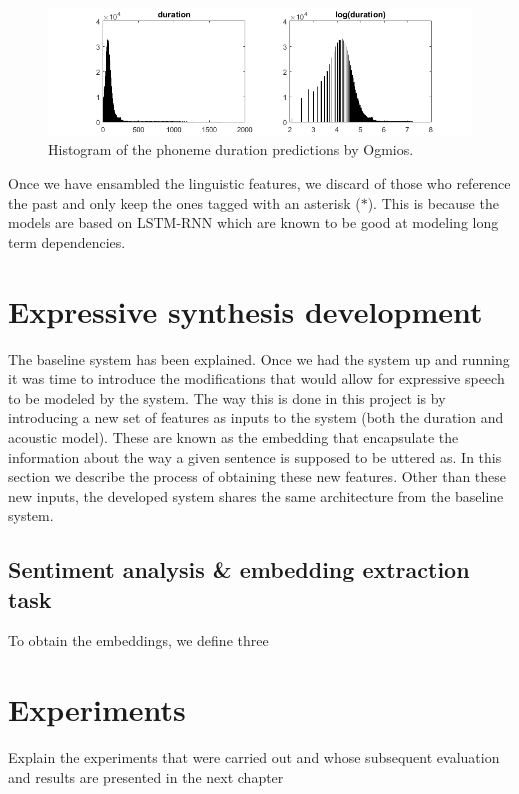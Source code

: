 \begin{figure}[h]
    \centering
    \includegraphics[width=14cm]{figures/dur}
    \caption{Histogram of the phoneme duration predictions by Ogmios.}
    \label{fig:hist-d}
\end{figure}

Once we have ensambled the linguistic features, we discard of those who reference the past and only keep the ones tagged with an asterisk ($*$). This is because the models are based on LSTM-RNN which are known to be good at modeling long term dependencies\cite{hochreiter1997long}.

\section{Expressive synthesis development}

The baseline system has been explained. Once we had the system up and running it was time to introduce the modifications that would allow for expressive speech to be modeled by the system. The way this is done in this project is by introducing a new set of features as inputs to the system (both the duration and acoustic model). These are known as the embedding that encapsulate the information about the way a given sentence is supposed to be uttered as. In this section we describe the process of obtaining these new features. Other than these new inputs, the developed system shares the same architecture from the baseline system.

\subsection{Sentiment analysis \& embedding extraction task}

To obtain the embeddings, we define three 

\section{Experiments}

Explain the experiments that were carried out and whose subsequent evaluation and results are presented in the next chapter
